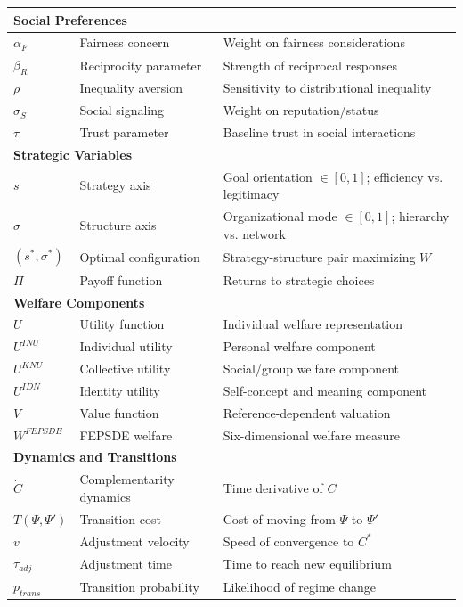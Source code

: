 \begin{center}
\begin{longtable}{lp{4cm}p{7cm}}
\multicolumn{3}{l}{\textbf{Social Preferences}} \\
\hline
$\alpha_F$ & Fairness concern & Weight on fairness considerations \\
$\beta_R$ & Reciprocity parameter & Strength of reciprocal responses \\
$\rho$ & Inequality aversion & Sensitivity to distributional inequality \\
$\sigma_S$ & Social signaling & Weight on reputation/status \\
$\tau$ & Trust parameter & Baseline trust in social interactions \\
\hline

\multicolumn{3}{l}{\textbf{Strategic Variables}} \\
\hline
$s$ & Strategy axis & Goal orientation $\in [0,1]$; efficiency vs. legitimacy \\
$\sigma$ & Structure axis & Organizational mode $\in [0,1]$; hierarchy vs. network \\
$(s^*, \sigma^*)$ & Optimal configuration & Strategy-structure pair maximizing $W$ \\
$\Pi$ & Payoff function & Returns to strategic choices \\
\hline

\multicolumn{3}{l}{\textbf{Welfare Components}} \\
\hline
$U$ & Utility function & Individual welfare representation \\
$U^{INU}$ & Individual utility & Personal welfare component \\
$U^{KNU}$ & Collective utility & Social/group welfare component \\
$U^{IDN}$ & Identity utility & Self-concept and meaning component \\
$V$ & Value function & Reference-dependent valuation \\
$W^{FEPSDE}$ & FEPSDE welfare & Six-dimensional welfare measure \\
\hline

\multicolumn{3}{l}{\textbf{Dynamics and Transitions}} \\
\hline
$\dot{C}$ & Complementarity dynamics & Time derivative of $C$ \\
$T(\Psi, \Psi')$ & Transition cost & Cost of moving from $\Psi$ to $\Psi'$ \\
$v$ & Adjustment velocity & Speed of convergence to $C^*$ \\
$\tau_{adj}$ & Adjustment time & Time to reach new equilibrium \\
$p_{trans}$ & Transition probability & Likelihood of regime change \\
\hline


\end{longtable}
\end{center}
